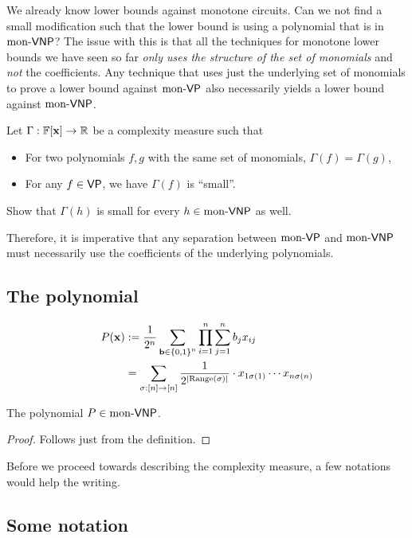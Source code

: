 We already know lower bounds against monotone circuits. Can we not find a small modification such that the lower bound is using a polynomial that is in $\mathrm{mon}\text{-}\mathsf{VNP}$? The issue with this is that all the techniques for monotone lower bounds we have seen so far \emph{only uses the structure of the set of monomials} and \emph{not} the coefficients. Any technique that uses just the underlying set of monomials to prove a lower bound against $\mathrm{mon}\text{-}\mathsf{VP}$ also necessarily yields a lower bound against $\mathrm{mon}\text{-}\mathsf{VNP}$.

\begin{exercise}
  Let $\Gamma:\mathbb{F}[\mathbf{x}] \rightarrow \mathbb{R}$ be a complexity measure such that
  \begin{itemize}
  \item For two polynomials $f,g$ with the same set of monomials, $\Gamma(f) = \Gamma(g)$,
  \item For any $f \in \mathsf{VP}$, we have $\Gamma(f)$ is ``small''.
  \end{itemize}
  Show that $\Gamma(h)$ is small for every $h \in \mathrm{mon}\text{-}\mathsf{VNP}$ as well. 
\end{exercise}

Therefore, it is imperative that any separation between $\mathrm{mon}\text{-}\mathsf{VP}$ and $\mathrm{mon}\text{-}\mathsf{VNP}$ must necessarily use the coefficients of the underlying polynomials.

\subsection*{The polynomial}

\begin{align*}
  P(\mathbf{x}) & := \frac{1}{2^n} \sum_{\mathbf{b} \in \left\{0,1\right\}^n} \prod_{i=1}^n \sum_{j=1}^n b_j x_{ij}\\
           & = \sum_{\sigma: [n] \rightarrow [n]} \frac{1}{2^{\left|\operatorname{Range}(\sigma)\right|}} \cdot x_{1\sigma(1)} \cdots x_{n\sigma(n)}
\end{align*}

\begin{lemma}
  The polynomial $P \in \mathrm{mon}\text{-}\mathsf{VNP}$. 
\end{lemma}
\begin{proof}
  Follows just from the definition. 
\end{proof}

Before we proceed towards describing the complexity measure, a few notations would help the writing. 

\subsection*{Some notation}


